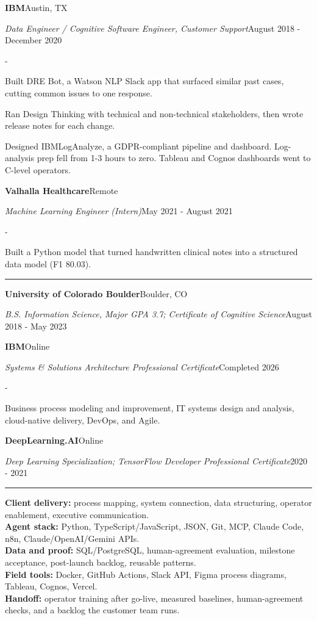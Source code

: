 \documentclass[10pt,letterpaper]{article}
\newenvironment{cvitems}{%
  \begin{list}{-}{%
    \setlength{\leftmargin}{12pt}%
    \setlength{\itemsep}{1.2pt}%
    \setlength{\parsep}{0pt}%
    \setlength{\topsep}{1.5pt}%
    \setlength{\partopsep}{0pt}%
    \setlength{\labelwidth}{6pt}%
    \setlength{\labelsep}{6pt}%
    \setlength{\itemindent}{0pt}%
  }%
}{\end{list}}
\newcommand{\cvsection}[1]{%
  \vspace{7pt}%
  \noindent{\bfseries\fontsize{11pt}{13pt}\selectfont\MakeUppercase{#1}}\par
  \vspace{1pt}%
  \noindent\rule{\textwidth}{0.4pt}\par
  \vspace{4pt}%
}
\newcommand{\cventryhead}[4]{%
  \noindent\textbf{#1}\hfill#2\par
  \vspace{0.5pt}%
  \noindent\textit{#3}\hfill#4\par
}
\newcommand{\cveduhead}[4]{%
  \noindent\textbf{#1}\hfill#2\par
  \vspace{0.5pt}%
  \noindent\textit{#3}\hfill#4\par
}
\begin{document}
\vspace{3pt}
\cventryhead{IBM}{Austin, TX}
{Data Engineer / Cognitive Software Engineer, Customer Support}{August 2018 - December 2020}
\begin{cvitems}
  \item Built DRE Bot, a Watson NLP Slack app that surfaced similar past cases, cutting common issues to one response.
  \item Ran Design Thinking with technical and non-technical stakeholders, then wrote release notes for each change.
  \item Designed IBMLogAnalyze, a GDPR-compliant pipeline and dashboard. Log-analysis prep fell from 1-3 hours to zero. Tableau and Cognos dashboards went to C-level operators.
\end{cvitems}

\vspace{3pt}
\cventryhead{Valhalla Healthcare}{Remote}
{Machine Learning Engineer (Intern)}{May 2021 - August 2021}
\begin{cvitems}
  \item Built a Python model that turned handwritten clinical notes into a structured data model (F1 80.03).
\end{cvitems}

\cvsection{Education}

\cveduhead{University of Colorado Boulder}{Boulder, CO}
{B.S. Information Science, Major GPA 3.7; Certificate of Cognitive Science}{August 2018 - May 2023}

\vspace{3pt}
\cveduhead{IBM}{Online}
{Systems \& Solutions Architecture Professional Certificate}{Completed 2026}
\begin{cvitems}
  \item Business process modeling and improvement, IT systems design and analysis, cloud-native delivery, DevOps, and Agile.

\vspace{3pt}
\cveduhead{DeepLearning.AI}{Online}
{Deep Learning Specialization; TensorFlow Developer Professional Certificate}{2020 - 2021}
\end{cvitems}

\cvsection{Skills}

\noindent\textbf{Client delivery:} process mapping, system connection, data structuring, operator enablement, executive communication.\\[2pt]
\noindent\textbf{Agent stack:} Python, TypeScript/JavaScript, JSON, Git, MCP, Claude Code, n8n, Claude/OpenAI/Gemini APIs.\\[2pt]
\noindent\textbf{Data and proof:} SQL/PostgreSQL, human-agreement evaluation, milestone acceptance, post-launch backlog, reusable patterns.\\[2pt]
\noindent\textbf{Field tools:} Docker, GitHub Actions, Slack API, Figma process diagrams, Tableau, Cognos, Vercel.\\[2pt]
\noindent\textbf{Handoff:} operator training after go-live, measured baselines, human-agreement checks, and a backlog the customer team runs.
\end{document}
